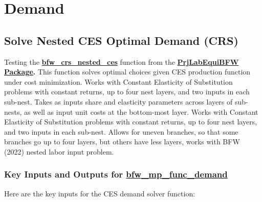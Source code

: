 \documentclass[
]{book}
\begin{document}
\hypertarget{demand}{%
\chapter{Demand}\label{demand}}

\hypertarget{solve-nested-ces-optimal-demand-crs}{%
\section{Solve Nested CES Optimal Demand (CRS)}\label{solve-nested-ces-optimal-demand-crs}}

Testing the
\href{https://github.com/FanWangEcon/PrjLabEquiBFW/blob/main/PrjLabEquiBFW/solvedemand/bfw_crs_nested_ces.m}{\textbf{bfw\_crs\_nested\_ces}}
function from the \href{https://fanwangecon.github.io/PrjLabEquiBFW/}{\textbf{PrjLabEquiBFW
Package}}\textbf{.} This
function solves optimal choices given CES production function under cost
minimization. Works with Constant Elasticity of Substitution problems
with constant returns, up to four nest layers, and two inputs in each
sub-nest. Takes as inputs share and elasticity parameters across layers
of sub-nests, as well as input unit costs at the bottom-most layer.
Works with Constant Elasticity of Substitution problems with constant
returns, up to four nest layers, and two inputs in each sub-nest. Allows
for uneven branches, so that some branches go up to four layers, but
others have less layers, works with BFW (2022) nested labor input
problem.

\hypertarget{key-inputs-and-outputs-for-bfw_mp_func_demand}{%
\subsection{\texorpdfstring{Key Inputs and Outputs for \href{https://github.com/FanWangEcon/PrjLabEquiBFW/tree/main/PrjLabEquiBFW/func/bfw_mp_func_demand.m}{\textbf{bfw\_mp\_func\_demand}}}{Key Inputs and Outputs for bfw\_mp\_func\_demand}}\label{key-inputs-and-outputs-for-bfw_mp_func_demand}}

Here are the key inputs for the CES demand solver function:
\end{document}
